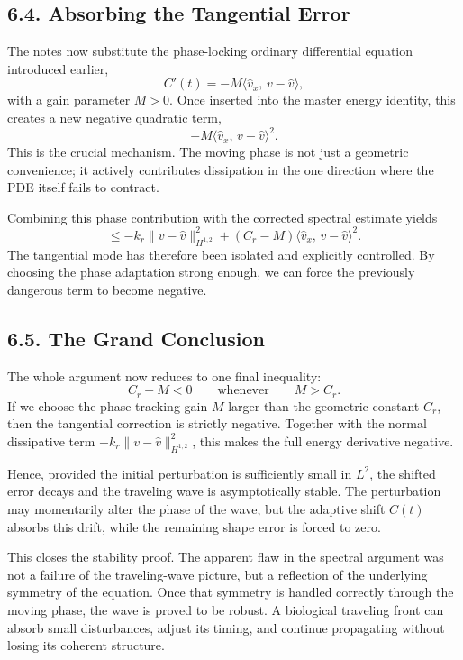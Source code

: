 \documentclass[11pt]{article}
\theoremstyle{definition}
\theoremstyle{remark}
\begin{document}
\subsection*{6.4. Absorbing the Tangential Error}
The notes now substitute the phase-locking ordinary differential equation introduced earlier,
\[
C'(t)=-M\langle \widehat v_x,\,v-\widehat v\rangle,
\]
with a gain parameter \(M>0\). Once inserted into the master energy identity, this creates a new negative quadratic term,
\[
-M\langle \widehat v_x,\,v-\widehat v\rangle^2.
\]
This is the crucial mechanism. The moving phase is not just a geometric convenience; it actively contributes dissipation in the one direction where the PDE itself fails to contract.

Combining this phase contribution with the corrected spectral estimate yields
\[
\le -k_r\|v-\widehat v\|_{H^{1,2}}^2 + (C_r-M)\langle \widehat v_x,\,v-\widehat v\rangle^2.
\]
The tangential mode has therefore been isolated and explicitly controlled. By choosing the phase adaptation strong enough, we can force the previously dangerous term to become negative.

\subsection*{6.5. The Grand Conclusion}
The whole argument now reduces to one final inequality:
\[
C_r-M<0
\qquad\text{whenever}\qquad
M>C_r.
\]
If we choose the phase-tracking gain \(M\) larger than the geometric constant \(C_r\), then the tangential correction is strictly negative. Together with the normal dissipative term \(-k_r\|v-\widehat v\|_{H^{1,2}}^2\), this makes the full energy derivative negative.

Hence, provided the initial perturbation is sufficiently small in \(L^2\), the shifted error decays and the traveling wave is asymptotically stable. The perturbation may momentarily alter the phase of the wave, but the adaptive shift \(C(t)\) absorbs this drift, while the remaining shape error is forced to zero.

This closes the stability proof. The apparent flaw in the spectral argument was not a failure of the traveling-wave picture, but a reflection of the underlying symmetry of the equation. Once that symmetry is handled correctly through the moving phase, the wave is proved to be robust. A biological traveling front can absorb small disturbances, adjust its timing, and continue propagating without losing its coherent structure.
\end{document}
